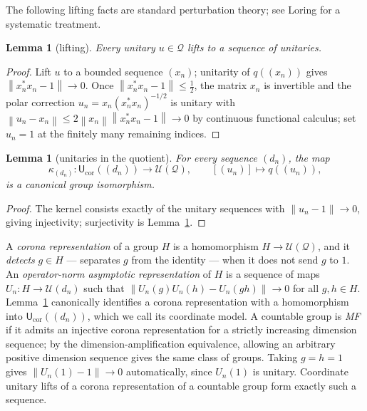 \documentclass[11pt]{amsart}
\newcommand{\leanverified}[2]{\ignorespaces}
\newtheorem{lemma}[theorem]{Lemma}
\theoremstyle{definition}
\theoremstyle{remark}
\theoremstyle{plain}
\newcommand{\U}{\mathcal U}
\newcommand{\Ucor}{\mathsf U_{\mathrm{cor}}}
\newcommand{\opnorm}[1]{\left\lVert #1\right\rVert}
\begin{document}
The following lifting facts are standard perturbation theory; see
Loring \cite{Loring} for a systematic treatment.

\begin{lemma}[lifting]\label{lem:lift}
Every unitary $u\in\mathcal Q$ lifts to a sequence of unitaries.
\leanverified{Sofic/ManuscriptExactWrappers}{GroupApproximation.ManuscriptExactWrappers.manuscriptUnitaryLifting}
\end{lemma}

\begin{proof}
Lift $u$ to a bounded sequence $(x_n)$; unitarity of $q((x_n))$ gives
$\opnorm{x_n^*x_n-1}\to0$.  Once $\opnorm{x_n^*x_n-1}\le\tfrac12$,
the matrix $x_n$ is invertible and the polar correction
$u_n=x_n(x_n^*x_n)^{-1/2}$ is unitary with
$\opnorm{u_n-x_n}\le2\opnorm{x_n}\opnorm{x_n^*x_n-1}\to0$ by
continuous functional calculus; set $u_n=1$ at the finitely many
remaining indices.
\end{proof}

\begin{lemma}[unitaries in the quotient]\label{lem:unitarycorona}
For every sequence $(d_n)$, the map
\[
 \kappa_{(d_n)}\colon \Ucor((d_n))\longrightarrow\U(\mathcal Q),
 \qquad [(u_n)]\longmapsto q((u_n)),
\]
is a canonical group isomorphism.
\leanverified{Sofic/ManuscriptExactWrappers}{GroupApproximation.ManuscriptExactWrappers.manuscriptUnitaryCoronaEquivalence}
\end{lemma}

\begin{proof}
The kernel consists exactly of the unitary sequences with
$\opnorm{u_n-1}\to0$, giving injectivity; surjectivity is
Lemma~\ref{lem:lift}.
\end{proof}

A \emph{corona representation} of a group $H$ is a homomorphism
$H\to\U(\mathcal Q)$, and it \emph{detects} $g\in H$ --- separates $g$
from the identity --- when it does not send $g$ to $1$.  An
\emph{operator-norm asymptotic representation} of $H$ is a sequence of
maps $U_n\colon H\to\U(d_n)$ such that
$\opnorm{U_n(g)U_n(h)-U_n(gh)}\to0$ for all $g,h\in H$.
Lemma~\ref{lem:unitarycorona} canonically identifies a corona
representation with a homomorphism into $\Ucor((d_n))$, which we call
its coordinate model.  A countable group is \emph{MF} if it admits an
injective corona representation for a strictly increasing dimension
sequence; by the dimension-amplification equivalence, allowing an
arbitrary positive dimension sequence gives the same class of groups.
Taking $g=h=1$ gives $\opnorm{U_n(1)-1}\to0$ automatically, since
$U_n(1)$ is unitary.  Coordinate unitary lifts of a corona
representation of a countable group form exactly such a sequence.
\end{document}
